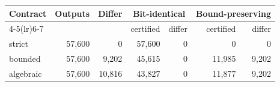 \begin{tabular}{lrrrrrr}
\toprule
Contract & Outputs & Differ & \multicolumn{2}{c}{Bit-identical} & \multicolumn{2}{c}{Bound-preserving}\\
\cmidrule(lr){4-5}\cmidrule(lr){6-7}
 & & & certified & differ & certified & differ\\
\midrule
strict & 57,600 & 0 & 57,600 & 0 & 0 & 0\\
bounded & 57,600 & 9,202 & 45,615 & 0 & 11,985 & 9,202\\
algebraic & 57,600 & 10,816 & 43,827 & 0 & 11,877 & 9,202\\
\bottomrule
\end{tabular}
